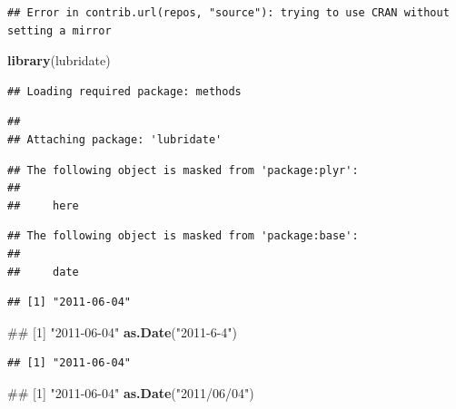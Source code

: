 \documentclass[10pt,]{krantz}
\makeatletter
\newenvironment{Shaded}{\begin{snugshade}}{\end{snugshade}}
\newcommand{\KeywordTok}[1]{\textcolor[rgb]{0.13,0.29,0.53}{\textbf{#1}}}
\newcommand{\StringTok}[1]{\textcolor[rgb]{0.31,0.60,0.02}{#1}}
\newcommand{\CommentTok}[1]{\textcolor[rgb]{0.56,0.35,0.01}{\textit{#1}}}
\newcommand{\NormalTok}[1]{#1}
\newenvironment{kframe}{%
\medskip{}
\setlength{\fboxsep}{.8em}
 \def\at@end@of@kframe{}%
 \ifinner\ifhmode%
  \def\at@end@of@kframe{\end{minipage}}%
  \begin{minipage}{\columnwidth}%
 \fi\fi%
 \def\FrameCommand##1{\hskip\@totalleftmargin \hskip-\fboxsep
 \colorbox{shadecolor}{##1}\hskip-\fboxsep
     \hskip-\linewidth \hskip-\@totalleftmargin \hskip\columnwidth}%
 \MakeFramed {\advance\hsize-\width
   \@totalleftmargin\z@ \linewidth\hsize
   \@setminipage}}%
 {\par\unskip\endMakeFramed%
 \at@end@of@kframe}
\renewenvironment{Shaded}{\begin{kframe}}{\end{kframe}}
\makeatother
\begin{document}
\begin{verbatim}
## Error in contrib.url(repos, "source"): trying to use CRAN without setting a mirror
\end{verbatim}

\begin{Shaded}
\begin{Highlighting}[]
\KeywordTok{library}\NormalTok{(lubridate)}
\end{Highlighting}
\end{Shaded}

\begin{verbatim}
## Loading required package: methods
\end{verbatim}

\begin{verbatim}
## 
## Attaching package: 'lubridate'
\end{verbatim}

\begin{verbatim}
## The following object is masked from 'package:plyr':
## 
##     here
\end{verbatim}

\begin{verbatim}
## The following object is masked from 'package:base':
## 
##     date
\end{verbatim}

\begin{Shaded}
\end{Shaded}

\begin{verbatim}
## [1] "2011-06-04"
\end{verbatim}

\begin{Shaded}
\begin{Highlighting}[]
\NormalTok{## [1] "2011-06-04"}
\KeywordTok{as.Date}\NormalTok{(}\StringTok{"2011-6-4"}\NormalTok{)}
\end{Highlighting}
\end{Shaded}

\begin{verbatim}
## [1] "2011-06-04"
\end{verbatim}

\begin{Shaded}
\begin{Highlighting}[]
\NormalTok{## [1] "2011-06-04"}
\KeywordTok{as.Date}\NormalTok{(}\StringTok{"2011/06/04"}\NormalTok{)}
\end{Highlighting}
\end{Shaded}
\end{document}
